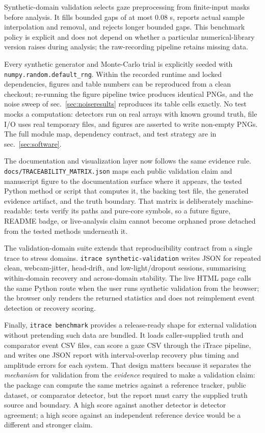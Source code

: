 \documentclass[
]{article}
\begin{document}
Synthetic-domain validation selects gaze preprocessing from finite-input
masks before analysis. It fills bounded gaps of at most 0.08 s, reports
actual sample interpolation and removal, and rejects longer bounded
gaps. This benchmark policy is explicit and does not depend on whether a
particular numerical-library version raises during analysis; the
raw-recording pipeline retains missing data.

Every synthetic generator and Monte-Carlo trial is explicitly seeded
with \texttt{numpy.random.default\_rng}. Within the recorded runtime and
locked dependencies, figures and table numbers can be reproduced from a
clean checkout; re-running the figure pipeline twice produces identical
PNGs, and the noise sweep of sec.~\ref{sec:noiseresults} reproduces its
table cells exactly. No test mocks a computation: detectors run on real
arrays with known ground truth, file I/O uses real temporary files, and
figures are asserted to write non-empty PNGs. The full module map,
dependency contract, and test strategy are in sec.~\ref{sec:software}.

The documentation and visualization layer now follows the same evidence
rule. \texttt{docs/TRACEABILITY\_MATRIX.json} maps each public
validation claim and manuscript figure to the documentation surface
where it appears, the tested Python method or script that computes it,
the backing test file, the generated evidence artifact, and the truth
boundary. That matrix is deliberately machine-readable: tests verify its
paths and pure-core symbols, so a future figure, README badge, or
live-analysis claim cannot become orphaned prose detached from the
tested methods underneath it.

The validation-domain suite extends that reproducibility contract from a
single trace to stress domains. \texttt{itrace\ synthetic-validation}
writes JSON for repeated clean, webcam-jitter, head-drift, and
low-light/dropout sessions, summarising within-domain recovery and
across-domain stability. The live HTML page calls the same Python route
when the user runs synthetic validation from the browser; the browser
only renders the returned statistics and does not reimplement event
detection or recovery scoring.

Finally, \texttt{itrace\ benchmark} provides a release-ready shape for
external validation without pretending such data are bundled. It loads
caller-supplied truth and comparator event CSV files, can score a gaze
CSV through the iTrace pipeline, and writes one JSON report with
interval-overlap recovery plus timing and amplitude errors for each
system. That design matters because it separates the \emph{mechanism}
for validation from the \emph{evidence} required to make a validation
claim: the package can compute the same metrics against a reference
tracker, public dataset, or comparator detector, but the report must
carry the supplied truth source and boundary. A high score against
another detector is detector agreement; a high score against an
independent reference device would be a different and stronger claim.
\end{document}
